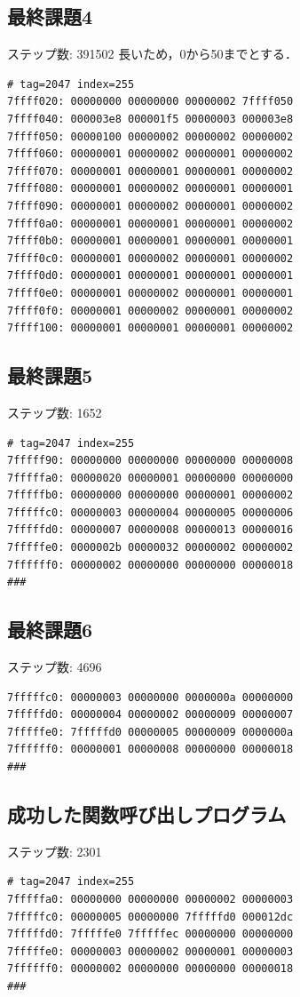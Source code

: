 \documentclass[a4paper,11pt]{jarticle}
\begin{document}
{\subsection{最終課題4}
ステップ数: 391502
長いため，0から50までとする．
\begin{verbatim}
# tag=2047 index=255
7ffff020: 00000000 00000000 00000002 7ffff050
7ffff040: 000003e8 000001f5 00000003 000003e8
7ffff050: 00000100 00000002 00000002 00000002
7ffff060: 00000001 00000002 00000001 00000002
7ffff070: 00000001 00000001 00000001 00000002
7ffff080: 00000001 00000002 00000001 00000001
7ffff090: 00000001 00000002 00000001 00000002
7ffff0a0: 00000001 00000001 00000001 00000002
7ffff0b0: 00000001 00000001 00000001 00000001
7ffff0c0: 00000001 00000002 00000001 00000002
7ffff0d0: 00000001 00000001 00000001 00000001
7ffff0e0: 00000001 00000002 00000001 00000001
7ffff0f0: 00000001 00000002 00000001 00000002
7ffff100: 00000001 00000001 00000001 00000002

\end{verbatim}
\subsection{最終課題5}
ステップ数: 1652 
\begin{verbatim}
# tag=2047 index=255
7fffff90: 00000000 00000000 00000000 00000008
7fffffa0: 00000020 00000001 00000000 00000000
7fffffb0: 00000000 00000000 00000001 00000002
7fffffc0: 00000003 00000004 00000005 00000006
7fffffd0: 00000007 00000008 00000013 00000016
7fffffe0: 0000002b 00000032 00000002 00000002
7ffffff0: 00000002 00000000 00000000 00000018
###

\end{verbatim}
\subsection{最終課題6}
ステップ数: 4696
\begin{verbatim}
7fffffc0: 00000003 00000000 0000000a 00000000
7fffffd0: 00000004 00000002 00000009 00000007
7fffffe0: 7fffffd0 00000005 00000009 0000000a
7ffffff0: 00000001 00000008 00000000 00000018
###
\end{verbatim}
\subsection{成功した関数呼び出しプログラム}
ステップ数: 2301
\begin{verbatim}
# tag=2047 index=255
7fffffa0: 00000000 00000000 00000002 00000003
7fffffc0: 00000005 00000000 7fffffd0 000012dc
7fffffd0: 7fffffe0 7fffffec 00000000 00000000
7fffffe0: 00000003 00000002 00000001 00000003
7ffffff0: 00000002 00000000 00000000 00000018
###


\end{verbatim}}
\end{document}
